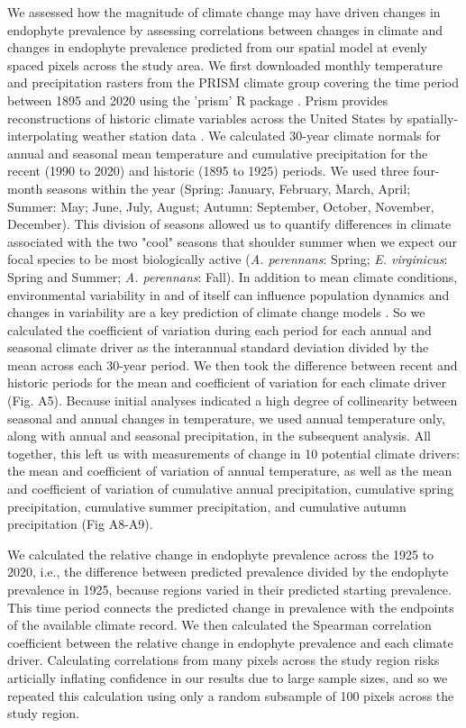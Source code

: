\documentclass[11pt]{article}
\let\cite\citep
\begin{document}
We assessed how the magnitude of climate change may have driven changes in endophyte prevalence by assessing correlations between changes in climate and changes in endophyte prevalence predicted from our spatial model at evenly spaced pixels across the study area. 
We first downloaded monthly temperature and precipitation rasters from the PRISM climate group \citep{daly2013prism} covering the time period between 1895 and 2020 using the 'prism' R package \citep{Rprism2015}. 
Prism provides reconstructions of historic climate variables across the United States by spatially-interpolating weather station data \citep{diLuzio2008constructing}. 
We calculated 30-year climate normals for annual and seasonal mean temperature and cumulative precipitation for the recent (1990 to 2020) and historic (1895 to 1925) periods.
We used three four-month seasons within the year (Spring: January, February, March, April; Summer: May; June, July, August; Autumn: September, October, November, December). 
This division of seasons allowed us to quantify differences in climate associated with the two "cool" seasons  that shoulder summer when we expect our focal species to be most biologically active (\emph{A. perennans}: Spring; \emph{E. virginicus}: Spring and Summer; \emph{A. perennans}: Fall). 
In addition to mean climate conditions, environmental variability  in and of itself can influence population dynamics \cite{tuljapurkar_population_1982} and changes in variability are a key prediction of climate change models \cite{stocker2013technical, ipcc_2021}.
So we calculated the coefficient of variation during each period for each annual and seasonal climate driver as the interannual standard deviation divided by the mean across each 30-year period.
We then took the difference between recent and historic periods for the mean and coefficient of variation for each climate driver (Fig. A5).
Because initial analyses indicated a high degree of collinearity between seasonal and annual changes in temperature, we used annual temperature only, along with annual and seasonal precipitation, in the subsequent analysis.
All together, this left us with measurements of change in 10 potential climate drivers: the mean and coefficient of variation of annual temperature, as well as the mean and coefficient of variation of cumulative annual precipitation, cumulative spring precipitation, cumulative summer precipitation, and cumulative autumn precipitation (Fig A8-A9).

We calculated the relative change in endophyte prevalence across the 1925 to 2020, i.e., the difference between predicted prevalence divided by the endophyte prevalence in 1925, because regions varied in their predicted starting prevalence. 
This time period connects the predicted change in prevalence with the endpoints of the available climate record.
We then calculated the Spearman correlation coefficient between the relative change in endophyte prevalence and each climate driver.
Calculating correlations from many pixels across the study region risks articially inflating confidence in our results due to large sample sizes, and so we repeated this calculation using only a random subsample of 100 pixels across the study region.
\end{document}
